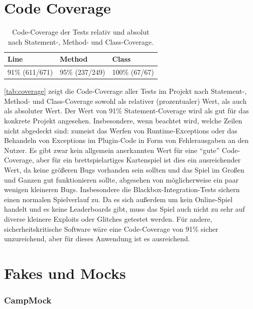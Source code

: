 \section{Code Coverage}

\begin{table}[H]
	\centering
	\begin{tabular}{l|l|l}
	Line & Method & Class \\
	\midrule
	91\% (611/671) & 95\% (237/249) & 100\% (67/67) 
	\end{tabular}
	\caption{Code-Coverage der Tests relativ und absolut nach Statement-, Method- und Class-Coverage.}
	\label{tab:coverage}
\end{table}

\autoref{tab:coverage} zeigt die Code-Coverage aller Tests im Projekt nach Statement-, Method- und Class-Coverage sowohl als relativer (prozentualer) Wert, 
als auch als absoluter Wert. Der Wert von 91\% Statement-Coverage wird als gut für das konkrete Projekt angesehen. Insbesondere, wenn beachtet wird, 
welche Zeilen nicht abgedeckt sind: zumeist das Werfen von Runtime-Exceptions oder das Behandeln von Exceptions im Plugin-Code in Form von 
Fehlerausgaben an den Nutzer. Es gibt zwar kein allgemein anerkannten Wert für eine \enquote{gute} Code-Coverage, aber für ein brettspielartiges 
Kartenspiel ist dies ein ausreichender Wert, da keine größeren Bugs vorhanden sein sollten und das Spiel im Großen und Ganzen gut funktionieren sollte,
abgesehen von möglicherweise ein paar wenigen kleineren Bugs. Insbesondere die Blackbox-Integration-Tests sichern einen normalen Spielverlauf zu. 
Da es sich außerdem um kein Online-Spiel handelt und es keine Leaderboards gibt, muss das Spiel auch nicht zu sehr auf diverse kleinere Exploits 
oder Glitches getestet werden. Für andere, sicherheitskritische Software wäre eine Code-Coverage von 91\% sicher unzureichend, aber für dieses 
Anwendung ist es ausreichend.       


\section{Fakes und Mocks}

\subsubsection{CampMock}

